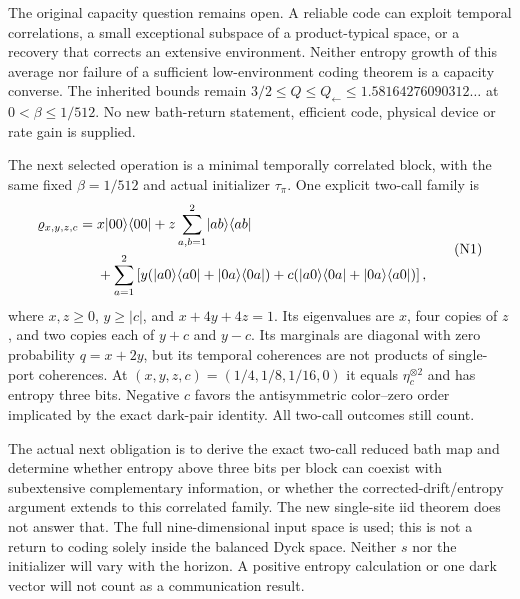 The original capacity question remains open. A reliable code can exploit
temporal correlations, a small exceptional subspace of a product-typical
space, or a recovery that corrects an extensive environment. Neither
entropy growth of this average nor failure of a sufficient low-environment
coding theorem is a capacity converse. The inherited bounds remain
$3/2\le Q\le Q_{\leftarrow}\le1.58164276090312\ldots$
at $0<\beta\le1/512$. No new bath-return statement, efficient code,
physical device or rate gain is supplied.

The next selected operation is a minimal temporally correlated block,
with the same fixed $\beta=1/512$ and actual initializer $\tau_\pi$.
One explicit two-call family is
\[
\begin{split}
 \varrho_{x,y,z,c}={}&x\lvert 00\rangle\langle 00\rvert
  +z\sum_{a,b=1}^2\lvert ab\rangle\langle ab\rvert\\
 &+\sum_{a=1}^2\left[
 y(\lvert a0\rangle\langle a0\rvert+\lvert 0a\rangle\langle 0a\rvert)
 +c(\lvert a0\rangle\langle 0a\rvert+\lvert 0a\rangle\langle a0\rvert)\right],
\end{split}
 \tag{N1}
\]
where $x,z\ge0$, $y\ge|c|$, and $x+4y+4z=1$.
Its eigenvalues are $x$, four copies of $z$, and two copies each
of $y+c$ and $y-c$. Its marginals are diagonal with zero probability
$q=x+2y$, but its temporal coherences are not products of single-port
coherences. At $(x,y,z,c)=(1/4,1/8,1/16,0)$ it equals
$\eta_c^{\otimes2}$ and has entropy three bits. Negative $c$ favors
the antisymmetric color--zero order implicated by the exact dark-pair
identity. All two-call outcomes still count.

The actual next obligation is to derive the exact two-call reduced bath
map and determine whether entropy above three bits per block can coexist
with subextensive complementary information, or whether the
corrected-drift/entropy argument extends to this correlated family.
The new single-site iid theorem does not answer that. The full
nine-dimensional input space is used; this is not a return to coding
solely inside the balanced Dyck space. Neither $s$ nor the initializer
will vary with the horizon. A positive entropy calculation or one
dark vector will not count as a communication result.
